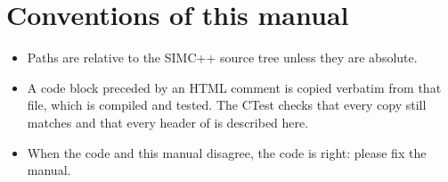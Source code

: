 \section*{\texorpdfstring{Conventions of this manual}{Conventions of this manual}}\label{developer_manual-index:conventions-of-this-manual}
\begin{itemize}
\item Paths are relative to the SIMC++ source tree  unless they are absolute.
\item A code block preceded by an HTML comment  is copied verbatim from that file, which is compiled
and tested. The CTest  checks that every copy still matches and that every header of 
is described here.
\item When the code and this manual disagree, the code is right: please fix the manual.
\end{itemize}
